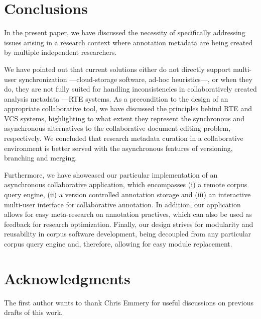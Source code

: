 \documentclass{sig-alternate}
\begin{document}
\section{Conclusions}\label{sec:conclusion}
In the present paper, we have discussed the necessity of specifically addressing issues arising
in a research context where annotation metadata are being created by multiple independent
researchers.

We have pointed out that current solutions either do not directly support multi-user
synchronization ---cloud-storage software, ad-hoc heuristics---, or when they do, they are not fully
suited for handling inconsistencies in collaboratively created analysis metadata ---RTE systems.
As a precondition to the design of an appropriate collaborative tool, we have discussed the
principles behind RTE and VCS systems, highlighting to what extent they represent
the synchronous and asynchronous alternatives to the collaborative document editing problem,
respectively.
We concluded that research metadata curation in a collaborative environment is better served with
the asynchronous features of versioning, branching and merging.

Furthermore, we have showcased our particular implementation of an asynchronous collaborative
application, which encompasses (i) a remote corpus query engine, (ii) a version controlled
annotation storage and (iii) an interactive multi-user interface for collaborative annotation.
In addition, our application allows for easy meta-research on annotation practives, which can
also be used as feedback for research optimization.
Finally, our design strives for modularity and reusability in corpus software development,
being decoupled from any particular corpus query engine and, therefore, allowing for easy module
replacement.

\section{Acknowledgments}
The first author wants to thank Chris Emmery for useful discussions on previous drafts of this work. 



%
%

\end{document}
